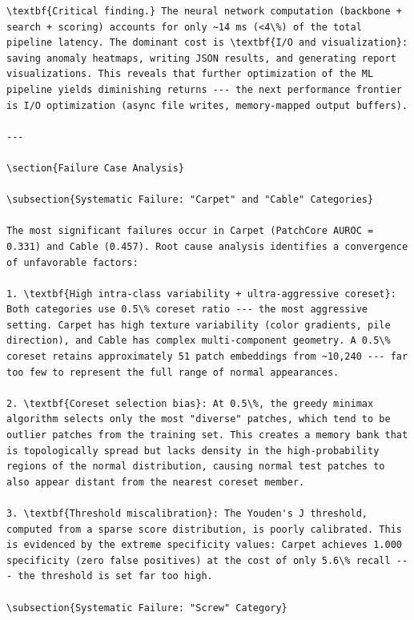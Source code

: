 \documentclass[12pt,a4paper,oneside]{report}
\begin{document}
\begin{verbatim}
\textbf{Critical finding.} The neural network computation (backbone + search + scoring) accounts for only ~14 ms (<4\%) of the total pipeline latency. The dominant cost is \textbf{I/O and visualization}: saving anomaly heatmaps, writing JSON results, and generating report visualizations. This reveals that further optimization of the ML pipeline yields diminishing returns --- the next performance frontier is I/O optimization (async file writes, memory-mapped output buffers).

---

\section{Failure Case Analysis}

\subsection{Systematic Failure: "Carpet" and "Cable" Categories}

The most significant failures occur in Carpet (PatchCore AUROC = 0.331) and Cable (0.457). Root cause analysis identifies a convergence of unfavorable factors:

1. \textbf{High intra-class variability + ultra-aggressive coreset}: Both categories use 0.5\% coreset ratio --- the most aggressive setting. Carpet has high texture variability (color gradients, pile direction), and Cable has complex multi-component geometry. A 0.5\% coreset retains approximately 51 patch embeddings from ~10,240 --- far too few to represent the full range of normal appearances.

2. \textbf{Coreset selection bias}: At 0.5\%, the greedy minimax algorithm selects only the most "diverse" patches, which tend to be outlier patches from the training set. This creates a memory bank that is topologically spread but lacks density in the high-probability regions of the normal distribution, causing normal test patches to also appear distant from the nearest coreset member.

3. \textbf{Threshold miscalibration}: The Youden's J threshold, computed from a sparse score distribution, is poorly calibrated. This is evidenced by the extreme specificity values: Carpet achieves 1.000 specificity (zero false positives) at the cost of only 5.6\% recall --- the threshold is set far too high.

\subsection{Systematic Failure: "Screw" Category}


\end{verbatim}
\end{document}
